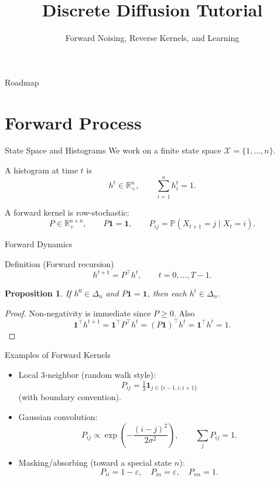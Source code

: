 \documentclass[aspectratio=169,11pt]{beamer}
\title{Discrete Diffusion Tutorial}
\subtitle{Forward Noising, Reverse Kernels, and Learning}
\author{}
\date{}
\newcommand{\ones}{\mathbf{1}}
\newtheorem{proposition}{Proposition}
\begin{document}
\begin{frame}
  \titlepage
\end{frame}

\begin{frame}{Roadmap}
\tableofcontents
\end{frame}

\section{Forward Process}

\begin{frame}{State Space and Histograms}
We work on a finite state space $\mathcal X=\{1,\dots,n\}$.

A histogram at time $t$ is
\[
h^t\in\mathbb R_+^n,\qquad \sum_{i=1}^n h_i^t=1.
\]

A forward kernel is row-stochastic:
\[
P\in\mathbb R_+^{n\times n},\qquad P\ones=\ones,
\qquad P_{ij}=\mathbb P(X_{t+1}=j\mid X_t=i).
\]
\end{frame}

\begin{frame}{Forward Dynamics}
\begin{block}{Definition (Forward recursion)}
\[
h^{t+1}=P^\top h^t,\qquad t=0,\dots,T-1.
\]
\end{block}

\begin{proposition}
If $h^0\in\Delta_n$ and $P\ones=\ones$, then each $h^t\in\Delta_n$.
\end{proposition}
\begin{proof}
Non-negativity is immediate since $P\ge 0$. Also
\[
\ones^\top h^{t+1}=\ones^\top P^\top h^t=(P\ones)^\top h^t=\ones^\top h^t=1.
\]
\end{proof}
\end{frame}

\begin{frame}{Examples of Forward Kernels}
\begin{itemize}
\item Local 3-neighbor (random walk style):
\[
P_{ij}=\tfrac13\mathbf 1_{j\in\{i-1,i,i+1\}}
\]
(with boundary convention).
\item Gaussian convolution:
\[
P_{ij}\propto \exp\!\left(-\frac{(i-j)^2}{2\sigma^2}\right),\qquad \sum_j P_{ij}=1.
\]
\item Masking/absorbing (toward a special state $n$):
\[
P_{ii}=1-\varepsilon,\quad P_{in}=\varepsilon,\quad P_{nn}=1.
\]
\end{itemize}
\end{frame}
\end{document}
